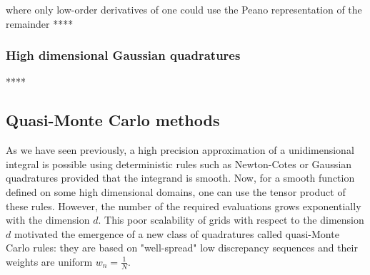 \documentclass[twoside,11pt]{book}
\numberwithin{theorem}{chapter}
\numberwithin{definition}{chapter}
\numberwithin{proposition}{chapter}
\numberwithin{corollary}{chapter}
\numberwithin{example}{chapter}
\numberwithin{lemma}{chapter}
\begin{document}
 where only low-order derivatives of  one could use the Peano representation of the remainder ****




\subsubsection{High dimensional Gaussian quadratures}
****

\subsection{Quasi-Monte Carlo methods}
As we have seen previously, a high precision approximation of a unidimensional integral  is possible using deterministic rules such as Newton-Cotes or Gaussian quadratures provided that the integrand is smooth. Now, for a smooth function defined on some high dimensional domains, one can use the tensor product of these rules. However, the number of the required evaluations grows exponentially with the dimension $d$. This poor scalability of grids with respect to the dimension $d$ motivated the emergence of a new class of quadratures called quasi-Monte Carlo rules: they are based on "well-spread" low discrepancy sequences and their weights are uniform $\displaystyle w_{n} = \frac{1}{N}$.







\end{document}
